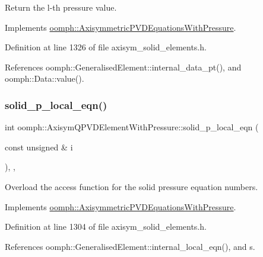 Return the l-\/th pressure value. 



Implements \hyperlink{classoomph_1_1AxisymmetricPVDEquationsWithPressure_aeb03a2cef37040790d5d9dacafb89144}{oomph\+::\+Axisymmetric\+P\+V\+D\+Equations\+With\+Pressure}.



Definition at line 1326 of file axisym\+\_\+solid\+\_\+elements.\+h.



References oomph\+::\+Generalised\+Element\+::internal\+\_\+data\+\_\+pt(), and oomph\+::\+Data\+::value().

\mbox{\label{classoomph_1_1AxisymQPVDElementWithPressure_a8c9fa9511418570fab627362609235d0}} 
\subsubsection{\texorpdfstring{solid\+\_\+p\+\_\+local\+\_\+eqn()}{solid\_p\_local\_eqn()}}
{\footnotesize\ttfamily int oomph\+::\+Axisym\+Q\+P\+V\+D\+Element\+With\+Pressure\+::solid\+\_\+p\+\_\+local\+\_\+eqn (\begin{DoxyParamCaption}\item[{const unsigned \&}]{i }\end{DoxyParamCaption})\hspace{0.3cm}{\ttfamily [inline]}, {\ttfamily [private]}, {\ttfamily [virtual]}}



Overload the access function for the solid pressure equation numbers. 



Implements \hyperlink{classoomph_1_1AxisymmetricPVDEquationsWithPressure_a7b77ffb084d0967b1220898613718d0b}{oomph\+::\+Axisymmetric\+P\+V\+D\+Equations\+With\+Pressure}.



Definition at line 1304 of file axisym\+\_\+solid\+\_\+elements.\+h.



References oomph\+::\+Generalised\+Element\+::internal\+\_\+local\+\_\+eqn(), and s.

